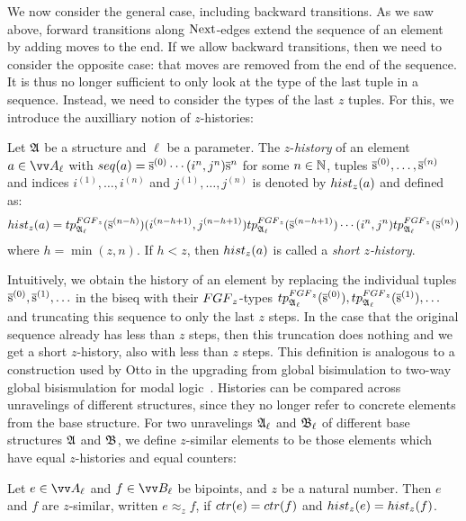 We now consider the general case, including backward transitions.
As we saw above, forward transitions along $\mathrm{Next}$-edges extend the sequence of an element by adding moves to the end.
If we allow backward transitions, then we need to consider the opposite case: that moves are removed from the end of the sequence.
It is thus no longer sufficient to only look at the type of the last tuple in a sequence.
Instead, we need to consider the types of the last $z$ tuples.
For this, we introduce the auxilliary notion of $z$-histories:
\begin{definition}[$z$-history]
  Let ${\mathfrak{A}}$ be a structure and $\ell$ be a parameter.
  The $z$-\emph{history} of an element $a \in \unraveldom{A}_{\ell}$ with $\seq{a} = \elemtuples^{(0)} \cdots (i^{n}, j^{n})\elemtuples^{n}$ for some $n \in {\mathbb{N}}$, tuples $\overline{\mathrm{s}}^{(0)}, \ldots, \overline{\mathrm{s}}^{(n)}$ and indices $i^{(1)}, \ldots, i^{(n)}$ and $j^{(1)}, \ldots, j^{(n)}$ is denoted by $\hist{z}{a}$ and defined as:
  \begin{equation*}
    \hist{z}{a} = \tp{\FGF_{z}}{\str{A_{\ell}}}{\elemtuples^{(n-h)}}(i^{(n-h+1)}, j^{(n-h+1)})\tp{\FGF_{z}}{\str{A_{\ell}}}{\elemtuples^{(n-h+1)}}\cdots(i^{n}, j^{n})\tp{\FGF_{z}}{\str{A}_{\ell}}{\elemtuples^{(n)}}
  \end{equation*}
  where $h = \min(z, n)$. If $h < z$, then $\hist{z}{a}$ is called a \emph{short $z$-history}.
\end{definition}
Intuitively, we obtain the history of an element by replacing the individual tuples $\overline{\mathrm{s}}^{(0)}, \overline{\mathrm{s}}^{(1)}, \ldots$ in the biseq with their $\FGF_{z}$-types $\tp{\FGF_{z}}{\str{A}_{\ell}}{\elemtuples^{(0)}}, \tp{\FGF_{z}}{\str{A}_{\ell}}{\elemtuples^{(1)}}, \ldots$ and truncating this sequence to only the last $z$ steps.
In the case that the original sequence already has less than $z$ steps, then this truncation does nothing and we get a short $z$-history, also with less than $z$ steps.
This definition is analogous to a construction used by Otto in the upgrading from global bisimulation to two-way global bisismulation for modal logic~\cite[Def. 39]{Otto04}.
Histories can be compared across unravelings of different structures, since they no longer refer to concrete elements from the base structure.
For two unravelings ${\mathfrak{A}}_{\ell}$ and ${\mathfrak{B}}_{\ell}$ of different base structures ${\mathfrak{A}}$ and ${\mathfrak{B}}$, we define $z$-similar elements to be those elements which have equal $z$-histories and equal counters:
\begin{definition}
 Let $e \in \unraveldom{A}_{\ell}$ and $f \in \unraveldom{B}_{\ell}$ be bipoints, and $z$ be a natural number. Then $e$ and $f$ are $z$-similar, written $e \approx_{z} f$, if $\ctr{e} = \ctr{f}$ and $\hist{z}{e} = \hist{z}{f}$.
\end{definition}
